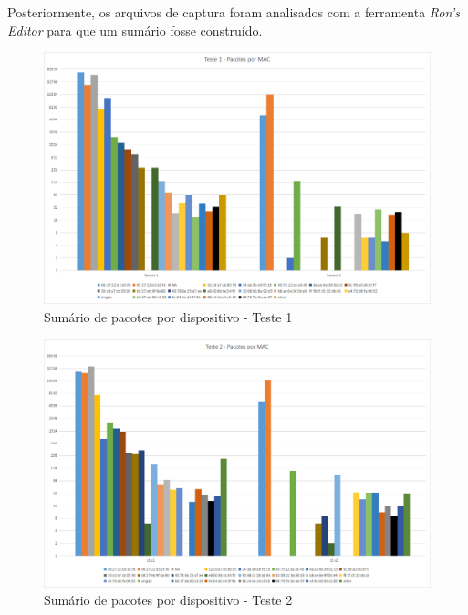 Posteriormente, os arquivos de captura foram analisados com a ferramenta
\emph{Ron’s Editor} para que um sumário fosse construído.

\clearpage
\begin{figure}[ht]
	\centering
	\caption{\label{fig-mg4-noise-t1}Sumário de pacotes por dispositivo - Teste 1}
	\includegraphics[height=0.32\textheight,width=1\textwidth]{060-testes/data-analisis/distance-mg4plus-netflix/Teste1.png}
\end{figure}

\begin{figure}[hb]
	\centering
	\caption{\label{fig-mg4-noise-t2}Sumário de pacotes por dispositivo - Teste 2}
	\includegraphics[height=0.32\textheight,width=1\textwidth]{060-testes/data-analisis/distance-mg4plus-netflix/Teste2.png}
\end{figure}

